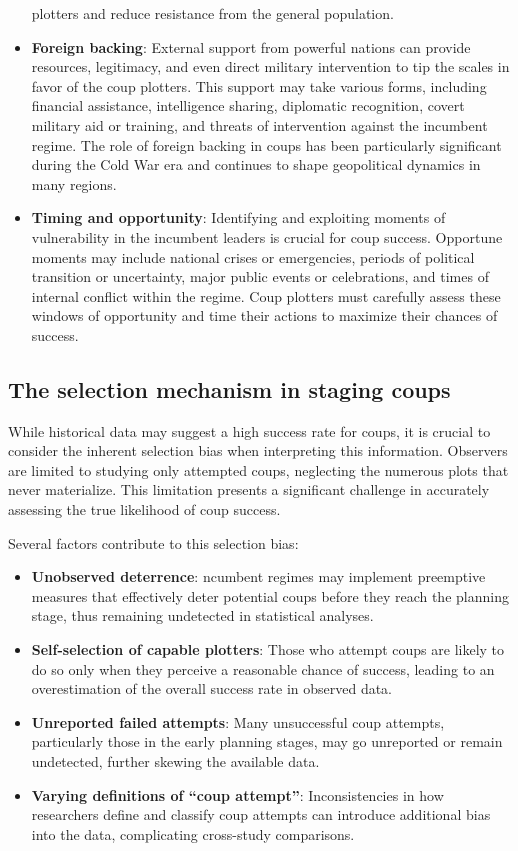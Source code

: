 \documentclass[
  12pt,
]{report}
\begin{document}
\begin{itemize}
  plotters and reduce resistance from the general population.
\item
  \textbf{Foreign backing}: External support from powerful nations can
  provide resources, legitimacy, and even direct military intervention
  to tip the scales in favor of the coup plotters. This support may take
  various forms, including financial assistance, intelligence sharing,
  diplomatic recognition, covert military aid or training, and threats
  of intervention against the incumbent regime. The role of foreign
  backing in coups has been particularly significant during the Cold War
  era and continues to shape geopolitical dynamics in many regions.
\item
  \textbf{Timing and opportunity}: Identifying and exploiting moments of
  vulnerability in the incumbent leaders is crucial for coup success.
  Opportune moments may include national crises or emergencies, periods
  of political transition or uncertainty, major public events or
  celebrations, and times of internal conflict within the regime. Coup
  plotters must carefully assess these windows of opportunity and time
  their actions to maximize their chances of success.
\end{itemize}

\subsection{The selection mechanism in staging
coups}\label{the-selection-mechanism-in-staging-coups}

While historical data may suggest a high success rate for coups, it is
crucial to consider the inherent selection bias when interpreting this
information. Observers are limited to studying only attempted coups,
neglecting the numerous plots that never materialize. This limitation
presents a significant challenge in accurately assessing the true
likelihood of coup success.

Several factors contribute to this selection bias:

\begin{itemize}
\item
  \textbf{Unobserved deterrence}: ncumbent regimes may implement
  preemptive measures that effectively deter potential coups before they
  reach the planning stage, thus remaining undetected in statistical
  analyses.
\item
  \textbf{Self-selection of capable plotters}: Those who attempt coups
  are likely to do so only when they perceive a reasonable chance of
  success, leading to an overestimation of the overall success rate in
  observed data.
\item
  \textbf{Unreported failed attempts}: Many unsuccessful coup attempts,
  particularly those in the early planning stages, may go unreported or
  remain undetected, further skewing the available data.
\item
  \textbf{Varying definitions of ``coup attempt''}: Inconsistencies in
  how researchers define and classify coup attempts can introduce
  additional bias into the data, complicating cross-study comparisons.
\end{itemize}
\end{document}
